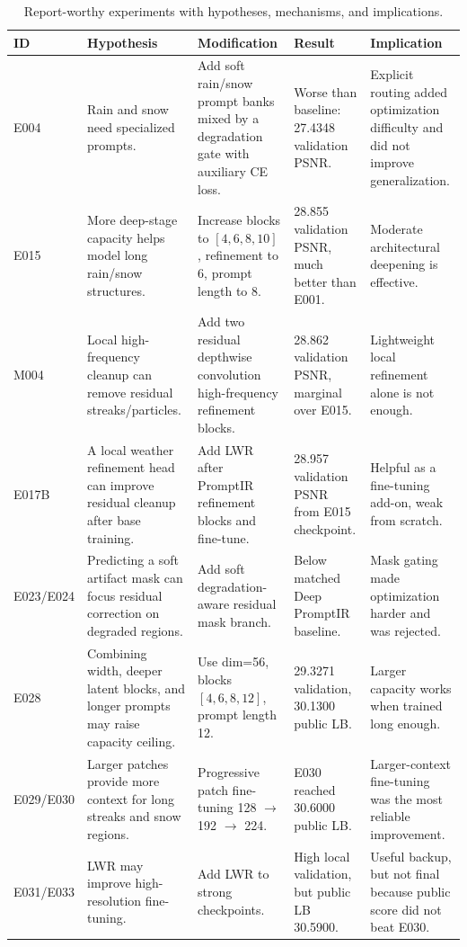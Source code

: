 \documentclass[10pt,conference]{article}
\begin{document}
\begin{table}[t]
\centering
\caption{Report-worthy experiments with hypotheses, mechanisms, and implications.}
\label{tab:hypotheses}
\begin{tabularx}{\textwidth}{p{}p{}p{}p{}X}
\toprule
ID & Hypothesis & Modification & Result & Implication \\
\midrule
E004 & Rain and snow need specialized prompts. & Add soft rain/snow prompt banks mixed by a degradation gate with auxiliary CE loss. & Worse than baseline: 27.4348 validation PSNR. & Explicit routing added optimization difficulty and did not improve generalization. \\
E015 & More deep-stage capacity helps model long rain/snow structures. & Increase blocks to $[4,6,8,10]$, refinement to 6, prompt length to 8. & 28.855 validation PSNR, much better than E001. & Moderate architectural deepening is effective. \\
M004 & Local high-frequency cleanup can remove residual streaks/particles. & Add two residual depthwise convolution high-frequency refinement blocks. & 28.862 validation PSNR, marginal over E015. & Lightweight local refinement alone is not enough. \\
E017B & A local weather refinement head can improve residual cleanup after base training. & Add LWR after PromptIR refinement blocks and fine-tune. & 28.957 validation PSNR from E015 checkpoint. & Helpful as a fine-tuning add-on, weak from scratch. \\
E023/E024 & Predicting a soft artifact mask can focus residual correction on degraded regions. & Add soft degradation-aware residual mask branch. & Below matched Deep PromptIR baseline. & Mask gating made optimization harder and was rejected. \\
E028 & Combining width, deeper latent blocks, and longer prompts may raise capacity ceiling. & Use dim=56, blocks $[4,6,8,12]$, prompt length 12. & 29.3271 validation, 30.1300 public LB. & Larger capacity works when trained long enough. \\
E029/E030 & Larger patches provide more context for long streaks and snow regions. & Progressive patch fine-tuning 128 $\rightarrow$ 192 $\rightarrow$ 224. & E030 reached 30.6000 public LB. & Larger-context fine-tuning was the most reliable improvement. \\
E031/E033 & LWR may improve high-resolution fine-tuning. & Add LWR to strong checkpoints. & High local validation, but public LB 30.5900. & Useful backup, but not final because public score did not beat E030. \\
\bottomrule
\end{tabularx}
\end{table}
\end{document}
